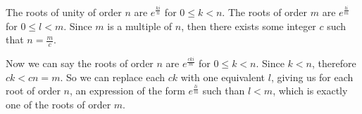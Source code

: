 \documentclass[fleqn]{article}
\newenvironment{answers}{ %
	\begin{enumerate}
		\setlength{\itemsep}{\bigskipamount}
}{\end{enumerate}}
\begin{document}
\begin{answers}
		The roots of unity of order \(n\) are \(e^{\frac{ki}{n}}\) for \(0 \leq k < n\). The roots of order \(m\) are \(e^{\frac{li}{m}}\) for \(0 \leq l < m\). Since \(m\) is a multiple of \(n\), then there exists some integer \(c\) such that \(n = \frac{m}{c}\).

		Now we can say the roots of order \(n\) are \(e^{\frac{cki}{m}}\) for \(0 \leq k < n\). Since \(k < n\), therefore \(ck < cn = m\). So we can replace each \(ck\) with one equivalent \(l\), giving us for each root of order \(n\), an expression of the form \(e^{\frac{li}{m}}\) such than \(l < m\), which is exactly one of the roots of order \(m\).
\end{answers}
\end{document}
